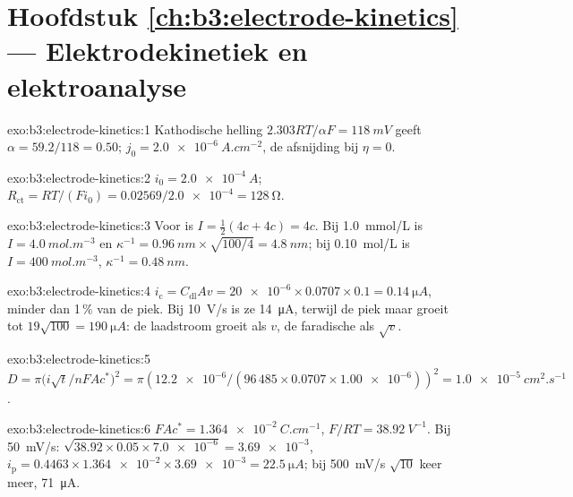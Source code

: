 \section*{Hoofdstuk \ref{ch:b3:electrode-kinetics} --- Elektrodekinetiek en elektroanalyse}

\begin{solution}{exo:b3:electrode-kinetics:1}
Kathodische helling $2.303RT/\alpha F = \qty{118}{mV}$ geeft $\alpha = 59.2/118 = 0.50$; $j_0 = \qty{2.0e-6}{A.cm^{-2}}$,
de afsnijding bij $\eta = 0$.
\end{solution}

\begin{solution}{exo:b3:electrode-kinetics:2}
$i_0 = \qty{2.0e-4}{A}$; $R_{\mathrm{ct}} = RT/(Fi_0) = 0.02569/\num{2.0e-4} = \qty{128}{\ohm}$.
\end{solution}

\begin{solution}{exo:b3:electrode-kinetics:3}
Voor  is $I = \frac12(4c + 4c) = 4c$. Bij \qty{1.0}{mmol/L} is $I = \qty{4.0}{mol.m^{-3}}$ en $\kappa^{-1} =
\qty{0.96}{nm} \times \sqrt{100/4} = \qty{4.8}{nm}$; bij \qty{0.10}{mol/L} is $I = \qty{400}{mol.m^{-3}}$, $\kappa^{-1} = \qty{0.48}{nm}$.
\end{solution}

\begin{solution}{exo:b3:electrode-kinetics:4}
$i_{\mathrm c} = C_{\mathrm{dl}}Av = \num{20e-6} \times 0.0707 \times 0.1 = \qty{0.14}{\micro A}$, minder dan 1\,\% van de piek. Bij
\qty{10}{V/s} is ze \qty{14}{\micro A}, terwijl de piek maar groeit tot $19\sqrt{100} = \qty{190}{\micro A}$:
de laadstroom groeit als $v$, de faradische als $\sqrt v$.
\end{solution}

\begin{solution}{exo:b3:electrode-kinetics:5}
$D = \pi\bigl(i\sqrt t/nFAc^*\bigr)^2 = \pi(\num{12.2e-6}/(96\,485 \times 0.0707 \times \num{1.00e-6}))^2 =
\qty{1.0e-5}{cm^2.s^{-1}}$.
\end{solution}

\begin{solution}{exo:b3:electrode-kinetics:6}
$FAc^* = \qty{1.364e-2}{C.cm^{-1}}$, $F/RT = \qty{38.92}{V^{-1}}$. Bij \qty{50}{mV/s}: $\sqrt{38.92 \times 0.05 \times \num{7.0e-6}} =
\num{3.69e-3}$, $i_{\mathrm p} = 0.4463 \times \num{1.364e-2} \times \num{3.69e-3} = \qty{22.5}{\micro A}$; bij \qty{500}{mV/s} $\sqrt{10}$ keer
meer, \qty{71}{\micro A}.
\end{solution}

